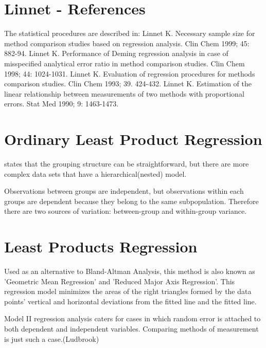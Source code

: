 \documentclass[12pt, a4paper]{report}
\theoremstyle{plain}
\theoremstyle{definition}
\theoremstyle{remark}
\begin{document}
\section{Linnet - References}
The statistical procedures are described in:
Linnet K. Necessary sample size for method comparison studies based on regression analysis. Clin Chem 1999; 45: 882-94.
Linnet K. Performance of Deming regression analysis in case of misspecified analytical error ratio in method comparison studies. Clin Chem 1998; 44: 1024-1031.
Linnet K. Evaluation of regression procedures for methods comparison studies. Clin Chem 1993; 39. 424-432.
Linnet K. Estimation of the linear relationship between measurements of two methods with proportional errors. Stat Med 1990; 9: 1463-1473.








\section{Ordinary Least Product Regression}
\citet{ludbrook97} states that the grouping structure can be
straightforward, but there are more complex data sets that have a hierarchical(nested) model.

Observations between groups are independent, but observations
within each groups are dependent because they belong to the same
subpopulation. Therefore there are two sources of variation:
between-group and within-group variance.




\section{Least Products Regression}
Used as an alternative to Bland-Altman Analysis, this method is also known as 'Geometric Mean Regression' and 'Reduced Major Axis Regression'. This regression model minimizes the areas of the right triangles formed by the data points' vertical and horizontal deviations from the fitted line and the fitted line.

 Model II regression analysis caters for cases in which random error is attached to both dependent and independent variables. Comparing methods of measurement is just such a case.(Ludbrook)
	
\end{document}
